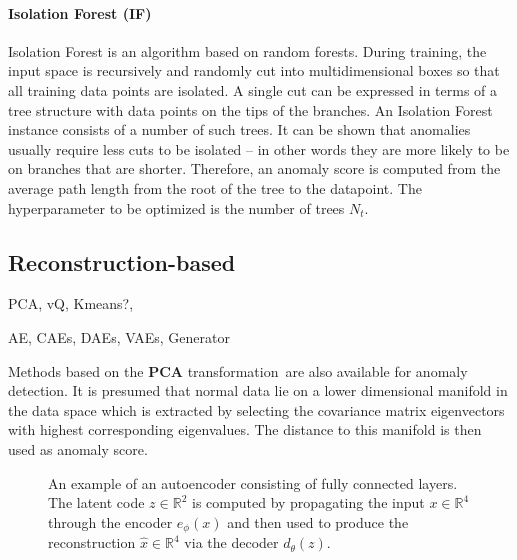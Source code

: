 \paragraph{Isolation Forest (IF)}
Isolation Forest \cite{liu2008isolation} is an algorithm based on random forests. During training, the input space is recursively and randomly cut into multidimensional boxes so that all training data points are isolated. A single cut can be expressed in terms of a tree structure with data points on the tips of the branches. An Isolation Forest instance consists of a number of such trees. It can be shown that anomalies usually require less cuts to be isolated -- in other words they are more likely to be on branches that are shorter. Therefore, an anomaly score is computed from the average path length from the root of the tree to the datapoint. The hyperparameter to be optimized is the number of trees $N_t$.

\subsection{Reconstruction-based}

PCA, vQ, Kmeans?, 

AE, CAEs, DAEs, VAEs, Generator

Methods based on the \textbf{PCA }transformation\,\cite{shyu2003novel,aggarwal2015outlier}\textbf{
}are also available for anomaly detection. It is presumed that normal
data lie on a lower dimensional manifold in the data space which is
extracted by selecting the covariance matrix eigenvectors with highest
corresponding eigenvalues. The distance to this manifold is then used
as anomaly score.


\begin{figure}
\begin{centering}

\par\end{centering}
\centering{}\caption{An example of an autoencoder consisting of fully connected layers.
The latent code $z\in\mathbb{R}^{2}$ is computed by propagating the
input $x\in\mathbb{R}^{4}$ through the encoder $e_{\phi}(x)$ and
then used to produce the reconstruction $\hat{x}\in\mathbb{R}^{4}$
via the decoder $d_{\theta}(z)$.}
\label{fig:ae}
\end{figure}

